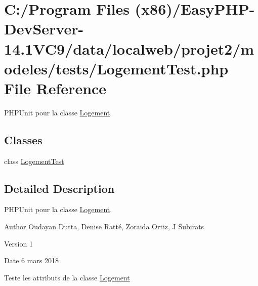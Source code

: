 \hypertarget{_logement_test_8php}{}\section{C\+:/\+Program Files (x86)/\+Easy\+P\+H\+P-\/\+Dev\+Server-\/14.1\+V\+C9/data/localweb/projet2/modeles/tests/\+Logement\+Test.php File Reference}
\label{_logement_test_8php}


P\+H\+P\+Unit pour la classe \hyperlink{class_logement}{Logement}.  


\subsection*{Classes}
\begin{DoxyCompactItemize}
\item 
class \hyperlink{class_logement_test}{Logement\+Test}
\end{DoxyCompactItemize}


\subsection{Detailed Description}
P\+H\+P\+Unit pour la classe \hyperlink{class_logement}{Logement}. 

\begin{DoxyAuthor}{Author}
Oudayan Dutta, Denise Ratté, Zoraida Ortiz, J Subirats 
\end{DoxyAuthor}
\begin{DoxyVersion}{Version}
1 
\end{DoxyVersion}
\begin{DoxyDate}{Date}
6 mars 2018
\end{DoxyDate}
Teste les attributs de la classe \hyperlink{class_logement}{Logement} 